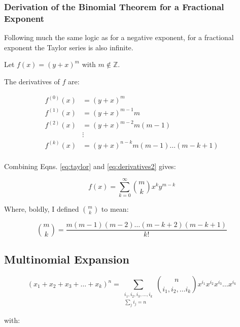 \subsubsection{Derivation of the Binomial Theorem for a Fractional Exponent}

Following much the same logic as for a negative exponent, for a fractional exponent the Taylor series is also infinite. 

Let $f(x) = (y+x)^{m}$ with $m\notin \mathbb{Z}$. 

The derivatives of $f$ are:

\begin{equation}
\begin{array}{ll}
f^{(0)}(x) &= (y+x)^{m}\\
f^{(1)}(x) &= (y+x)^{m-1}m\\
f^{(2)}(x) &= (y+x)^{m-2}m(m-1)\\
&\vdots\\
f^{(k)}(x) &= (y+x)^{n-k}m(m-1)\hdots	(m-k+1)\\
\end{array}
\label{eq:derivatives2}
\end{equation} 

Combining Eqns. \ref{eq:taylor} and \ref{eq:derivatives2} gives:

\begin{equation}
f(x) = \sum_{k=0}^\infty { m \choose k } x^k y^{m-k}
\end{equation}

Where, boldly, I defined ${ m \choose k}$ to mean:

\begin{equation}
{m \choose k} = \frac{m(m-1)(m-2)\hdots(m-k+2)(m-k+1)}{k!}
\end{equation}


\subsection{Multinomial Expansion}

\begin{equation}
(x_1 + x_2 + x_3 + \hdots + x_k)^n = \sum_{\begin{array}{c} i_1,i_2,i_3,\hdots,i_k \\ \sum_j i_j = n\end{array}} {n \choose i_1,i_2,\hdots i_k}x^{i_1}x^{i_2}x^{i_3}\hdots x^{i_k}
\end{equation}

with:

